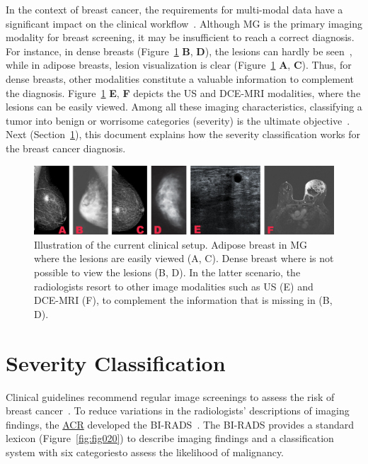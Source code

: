 In the context of breast cancer, the requirements for multi-modal data have a significant impact on the clinical workflow~\cite{10.1117/1.JBO.22.4.046008}.
Although \ac{MG} is the primary imaging modality for breast screening, it may be insufficient to reach a correct diagnosis.
For instance, in dense breasts (Figure~\ref{fig:fig005} {\bf B}, {\bf D}), the lesions can hardly be seen~\cite{10.1093/jbi/wbaa010}, while in adipose breasts, lesion visualization is clear (Figure~\ref{fig:fig005} {\bf A}, {\bf C}).
Thus, for dense breasts, other modalities constitute a valuable information to complement the diagnosis.
Figure~\ref{fig:fig005} {\bf E}, {\bf F} depicts the \ac{US} and \ac{DCE}-\ac{MRI} modalities, where the lesions can be easily viewed.
Among all these imaging characteristics, classifying a tumor into benign or worrisome categories (severity) is the ultimate objective~\cite{SHAN2016980}.
Next (Section~\ref{sec:chap002003}), this document explains how the severity classification works for the breast cancer diagnosis.

\begin{figure}[htbp]
\centering
\includegraphics[width=\columnwidth]{images/fig005}
\caption{Illustration of the current clinical setup. Adipose breast in MG where the lesions are easily viewed (A, C). Dense breast where is not possible to view the lesions (B, D). In the latter scenario, the radiologists resort to other image modalities such as US (E) and DCE-MRI (F), to complement the information that is missing in (B, D).}
\label{fig:fig005}
\end{figure}

\section{Severity Classification}
\label{sec:chap002003}

Clinical guidelines recommend regular image screenings to assess the risk of breast cancer~\cite{MIAO201817}.
To reduce variations in the radiologists’ descriptions of imaging findings, the \href{https://www.acr.org/}{\ac{ACR}} developed the \ac{BI-RADS}~\cite{d2018breast}.
The \ac{BI-RADS} provides a standard lexicon (Figure~\ref{fig:fig020}) to describe imaging findings and a classification system with six categories\footnotemark[5] to assess the likelihood of malignancy.

